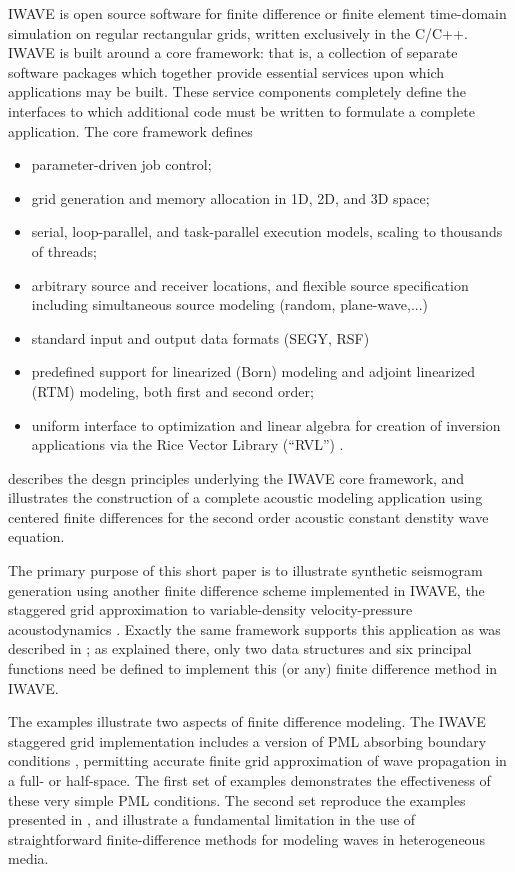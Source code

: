 IWAVE is open source
software for finite difference or finite element time-domain
simulation on regular rectangular grids, written exclusively in the
C/C++. IWAVE is built around a core framework: that is,
a collection of separate software packages which together provide
essential services upon which applications may be built. These
service components completely define the interfaces to which
additional code must be written to formulate a complete
application. The core framework defines
\begin{itemize}
\item parameter-driven job control;
\item grid generation and memory allocation in 1D, 2D, and 3D space;
\item serial, loop-parallel, and task-parallel execution models,
scaling to thousands of threads; 
\item arbitrary source and receiver locations, and flexible
source specification including simultaneous source modeling (random,
plane-wave,...)
\item standard input and output data formats (SEGY, RSF)
\item predefined support for linearized (Born) modeling and adjoint
  linearized (RTM) modeling, both first and second order;
\item uniform interface to optimization and linear algebra for
  creation of inversion applications via the
  Rice Vector Library (``RVL'') \cite[]{RVLTOMS,GeoPros:11}.
\end{itemize}
\cite{trip14:struct} describes the desgn principles
underlying the IWAVE core framework, and illustrates the construction
of a complete acoustic modeling application using centered finite
differences for the second order acoustic constant denstity wave equation.

The primary purpose of this short paper is to illustrate 
synthetic seismogram generation using another finite
difference scheme implemented in IWAVE, the staggered grid approximation to
variable-density velocity-pressure acoustodynamics \cite[]{Vir:84}. 
Exactly the same framework supports this application as was described
in \cite{trip14:struct}; as explained there, only two data structures
and six principal functions need be defined to implement this (or any) finite
difference method in IWAVE. 

The examples illustrate two aspects of finite difference modeling.
The IWAVE staggered grid implementation includes a version of PML
absorbing boundary conditions \cite[]{Habashy:07}, permitting accurate
finite grid approximation of wave propagation in a full- or
half-space. The first set of examples demonstrates the effectiveness
of these very simple PML conditions.
The second set reproduce the examples presented in 
\cite{SymesVdovina:09}, and illustrate a fundamental limitation in the
use of straightforward finite-difference methods for modeling waves in
heterogeneous media.


